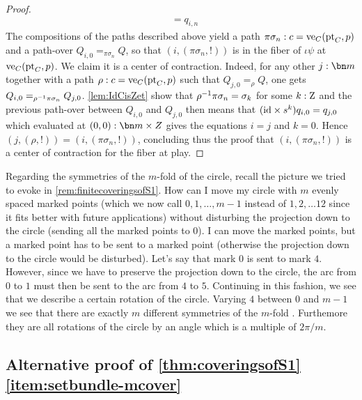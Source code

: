 \begin{proof}
\begin{displaymath}
\begin{split}
      &= q_{i,n}
    \end{split}
  \end{displaymath}
  The compositions of the paths described above yield a path
  $\pi\sigma_n: c = \ve_C(\pt_C,p)$ and a path-over
  $Q_{i,0} =_{\pi\sigma_n} Q$, so that $(i,(\pi\sigma_n,!))$ is in the
  fiber of $\iota\psi$ at $\ve_C(\pt_C,p)$. We claim it is a center of
  contraction. Indeed, for any other $j:\bn m$ together with a path
  $\rho:c=\ve_C(\pt_C,p)$ such that $Q_{j,0}=_\rho Q$, one gets
  $Q_{i,0}=_{\rho^{-1} \pi\sigma_n}Q_{j,0}$. \cref{lem:IdCisZet} show
  that $\rho^{-1}\pi\sigma_n = \sigma_k$ for some $k:\mathrm{Z}$ and the
  previous path-over between $Q_{i,0}$ and $Q_{j,0}$ then means that
  $(\mathord{\mathrm{id}} \times s^k)q_{i,0}=q_{j,0}$ which evaluated at
  $(0,0):\bn m\times Z$ gives the equations $i=j$ and $k=0$. Hence
  $(j,(\rho,!)) = (i,(\pi\sigma_n,!))$, concluding thus the proof that
  $(i,(\pi\sigma_n,!))$ is a center of contraction for the fiber at
  play.

  \end{proof}

  \begin{remark}
    Regarding the symmetries of the $m$-fold \covering of the circle, recall the picture we tried to evoke in \cref{rem:finitecoveringsofS1}.  How can I move my circle with $m$ evenly spaced marked points  (which we now call $0,1,\dots, m-1$ instead of $1,2,\dots 12$ since it fits better with future applications) without disturbing the projection down to the circle (sending all the marked points to $0$).  I can move the marked points, but a marked point has to be sent to a marked point (otherwise the projection down to the circle would be disturbed).  Let's say that mark $0$ is sent to mark $4$.  However, since we have to preserve the projection down to the circle, the arc from $0$ to $1$ must then be sent to the arc from $4$ to $5$.  Continuing in this fashion, we see that we describe a certain rotation of the circle.  Varying $4$ between $0$ and $m-1$ we see that there are exactly $m$ different symmetries of the $m$-fold \covering.  Furthemore they are all rotations of the circle by an angle which is a multiple of $2\pi/m$.
  \end{remark}


\subsection*{Alternative proof of \cref{thm:coveringsofS1}\ref{item:setbundle-mcover}}

